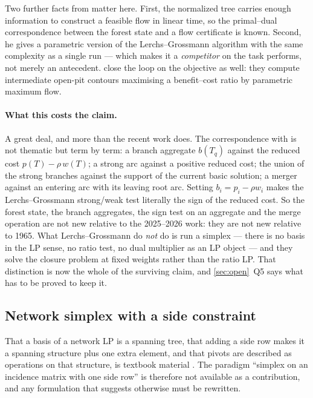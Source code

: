 Two further facts from \citet{Hochbaum2001} matter here. First, the normalized
tree carries enough information to construct a feasible flow in linear time, so
the primal--dual correspondence between the forest state and a flow certificate
is known. Second, he gives a parametric version of the Lerchs--Grossmann
algorithm with the same complexity as a single run --- which makes it a
\emph{competitor} on the task \FS{} performs, not merely an antecedent.
\citet{PicardSmith2004} close the loop on the objective as well: they compute
intermediate open-pit contours maximising a benefit--cost ratio by parametric
maximum flow.

\paragraph{What this costs the claim.} A great deal, and more than the recent
work does. The correspondence with \FS{} is not thematic but term by term: a
branch aggregate $b(T_q)$ against the reduced cost $p(T) - \rho\,w(T)$; a strong
arc against a positive reduced cost; the union of the strong branches against
the support of the current basic solution; a merger against an entering arc with
its leaving root arc. Setting $b_i = p_i - \rho w_i$ makes the Lerchs--Grossmann
strong/weak test literally the sign of the \FS{} reduced cost. So the forest
state, the branch aggregates, the sign test on an aggregate and the merge
operation are not new relative to the 2025--2026 work: they are not new relative
to 1965. What Lerchs--Grossmann do \emph{not} do is run a simplex --- there is no
basis in the LP sense, no ratio test, no dual multiplier as an LP object --- and
they solve the closure problem at fixed weights rather than the ratio LP.
That distinction is now the whole of the surviving claim, and
\cref{sec:open}~Q5 says what has to be proved to keep it.

\subsection{Network simplex with a side constraint}

That a basis of a network LP is a spanning tree, that adding a side row makes it
a spanning structure plus one extra element, and that pivots are described as
operations on that structure, is textbook material
\citep{AhujaEtAl1993,Schrijver2003}. The paradigm ``simplex on an incidence
matrix with one side row'' is therefore not available as a contribution, and any
formulation that suggests otherwise must be rewritten.

